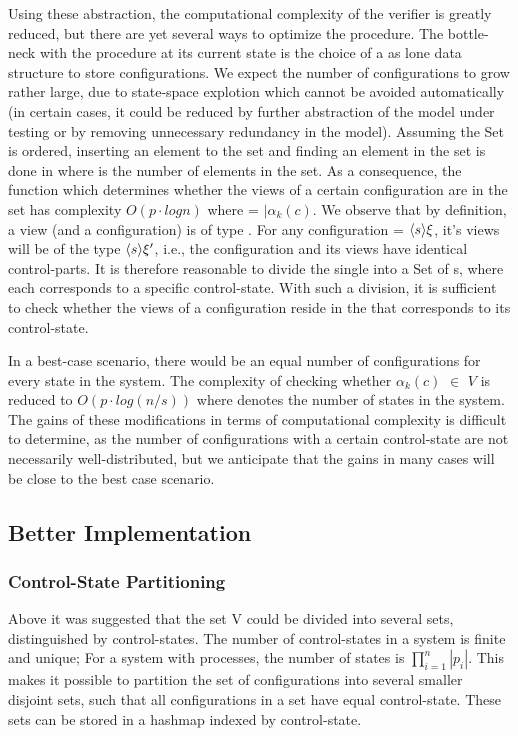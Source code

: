 Using these abstraction, the computational complexity of the verifier is greatly reduced, but there are yet several ways to optimize the procedure. The bottle-neck with the procedure at its current state is the choice of a  as lone data structure to store configurations. We expect the number of configurations to grow rather large, due to state-space explotion which cannot be avoided automatically (in certain cases, it could be reduced by further abstraction of the model under testing or by removing unnecessary redundancy in the model). Assuming the Set is ordered, inserting an element to the set and finding an element in the set is done in  where  is the number of elements in the set. As a consequence, the function  which determines whether the views of a certain configuration are in the set has complexity $O(p \cdot log n)$ where  = $|\alpha_k(c)$. We observe that by definition, a view (and a configuration) is of type . For any configuration  = $\langle s\rangle{\xi}$, it's views will be of the type $\langle s\rangle{\xi'}$, i.e., the configuration and its views have identical control-parts. It is therefore reasonable to divide the single  into a Set of s, where each  corresponds to a specific control-state. With such a division, it is sufficient to check whether the views of a configuration reside in the  that corresponds to its control-state.

In a best-case scenario, there would be an equal number of configurations for every state in the system. The complexity of checking whether $\alpha_k(c)$ $\in$ $V$ is reduced to $O(p \cdot log (n/s))$ where  denotes the number of states in the system. The gains of these modifications in terms of computational complexity is difficult to determine, as the number of configurations with a certain control-state are not necessarily well-distributed, but we anticipate that the gains in many cases will be close to the best case scenario.

\subsection{Better Implementation}
\subsubsection{Control-State Partitioning}
Above it was suggested that the set V could be divided into several sets, distinguished by control-states. The number of control-states in a system is finite and unique; For a system with  processes, the number of states is $\prod\limits_{i=1}^n|p_i|$. This makes it possible to partition the set of configurations into several smaller disjoint sets, such that all configurations in a set have equal control-state. These sets can be stored in a hashmap indexed by control-state. 

